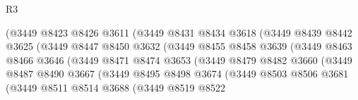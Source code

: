 \begin{lexlean}{R3}
\begin{coremodule}
                                (@3449
                                  @8423
                                  @8426
                                  @3611
                                  (@3449
                                    @8431
                                    @8434
                                    @3618
                                    (@3449
                                      @8439
                                      @8442
                                      @3625
                                      (@3449
                                        @8447
                                        @8450
                                        @3632
                                        (@3449
                                          @8455
                                          @8458
                                          @3639
                                          (@3449
                                            @8463
                                            @8466
                                            @3646
                                            (@3449
                                              @8471
                                              @8474
                                              @3653
                                              (@3449
                                                @8479
                                                @8482
                                                @3660
                                                (@3449
                                                  @8487
                                                  @8490
                                                  @3667
                                                  (@3449
                                                    @8495
                                                    @8498
                                                    @3674
                                                    (@3449
                                                      @8503
                                                      @8506
                                                      @3681
                                                      (@3449
                                                        @8511
                                                        @8514
                                                        @3688
                                                        (@3449
                                                          @8519
                                                          @8522

\end{coremodule}
\end{lexlean}

